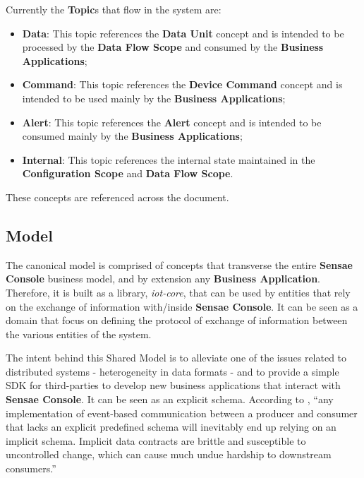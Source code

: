 Currently the \textbf{Topic}s that flow in the system are:

\begin{itemize}
   \item \textbf{Data}: This topic references the \textbf{Data Unit} concept and is intended to be processed by the \textbf{Data Flow Scope} and consumed by the \textbf{Business Applications};
   \item \textbf{Command}: This topic references the \textbf{Device Command} concept and is intended to be used mainly by the \textbf{Business Applications};
   \item \textbf{Alert}: This topic references the \textbf{Alert} concept and is intended to be consumed mainly by the \textbf{Business Applications};
   \item \textbf{Internal}: This topic references the internal state maintained in the \textbf{Configuration Scope} and \textbf{Data Flow Scope}.
\end{itemize}

These concepts are referenced across the document.

\subsection{Model}
\label{subsec:design:domain:shared_model}

The canonical model is comprised of concepts that transverse the entire \textbf{Sensae Console} business model, and by extension any \textbf{Business Application}. Therefore, it is built as a library, \textit{iot-core}, that can be used by entities that rely on the exchange of information with/inside \textbf{Sensae Console}. It can be seen as a domain that focus on defining the protocol of exchange of information between the various entities of the system.

The intent behind this Shared Model is to alleviate one of the issues related to distributed systems - heterogeneity in data formats \parencite{nadiminti2006distributed} - and to provide a simple \gls{SDK} for third-parties to develop new business applications that interact with \textbf{Sensae Console}. It can be seen as an explicit schema. According to \cite{explicitsharedmodel}, ``any implementation of event-based communication between a producer and consumer that lacks an explicit predefined schema will inevitably end up relying on an implicit schema. Implicit data contracts are brittle and susceptible to uncontrolled change, which can cause much undue hardship to downstream consumers.''

